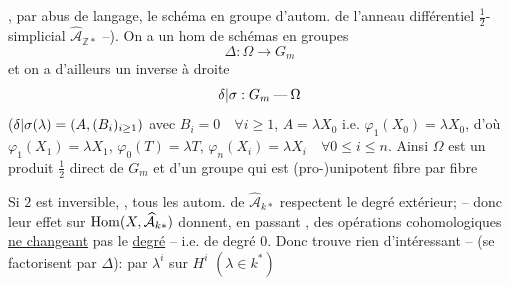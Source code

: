, par abus de langage, le schéma en groupe d'autom. de l'anneau différentiel
$\tfrac12$-simplicial $\widehat{\mathcal A}_{\mathbb Z*}$ --).
On a un hom de schémas en groupes
\[
 \Delta:\Omega\longrightarrow G_m
\]
et on a d'ailleurs un inverse à droite
\[
 {\delta|\sigma}:G_m\mathbin{\text{---}}\Omega
\]
(${\delta|\sigma}(\lambda)=(A,(B_i)_{i\geq1})$ avec $B_i=0\quad\forall i\geq1$,
$A=\lambda X_0$ i.e. $\varphi_1(X_0)=\lambda X_0$, d'où $\varphi_1(X_1)=\lambda X_1$,
$\varphi_0(T)=\lambda T$, $\varphi_n(X_i)=\lambda X_i\quad\forall0\leq i\leq n$.
Ainsi $\Omega$ est  un produit $\frac12$ direct
de $G_m$ et d'un groupe qui est (pro-)unipotent fibre par fibre

Si $2$ est inversible, 
 , tous les autom. de $\widehat{\mathcal A}_{k*}$
respectent le degré extérieur; -- donc
leur effet sur $\operatorname{Hom}({X},\widehat{\mathcal A}_{k*})$
donnent, en passant , des
opérations cohomologiques \uline{ne changeant} pas le \uline{degré} -- i.e. de degré $0$.
Donc  trouve rien d'intéressant
--  (se factorisent par $\Delta$):
 par $\lambda^i$ sur $H^i$ $(\lambda\in k^*)$

